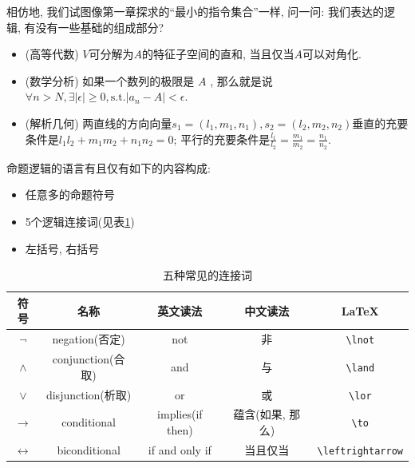相仿地, 我们试图像第一章探求的``最小的指令集合''一样, 问一问: 我们表达的逻辑, 有没有一些基础的组成部分? 

\begin{example}
	\begin{itemize}
		\item (高等代数) $V$可分解为$A$的特征子空间的直和, 当且仅当$A$可以对角化. 
		\item (数学分析) 如果一个数列的极限是 $A$ , 那么就是说$\forall n>N, \exists |\epsilon|\geq 0, \text{s.t.} |a_n-A|<\epsilon$.
		\item (解析几何) 两直线的方向向量$s_{1}=(l_{1},m_{1},n_{1}),s_{2}=(l_{2},m_{2},n_{2})$垂直的充要条件是$l_{1}l_{2}+m_{1}m_{2}+n_{1}n_{2}=0$;
平行的充要条件是$\frac{l_{1}}{l_{2}}=\frac{m_{1}}{m_{2}}=\frac{n_{1}}{n_{2}}.$
	\end{itemize}
\end{example}



\begin{definition}[命题逻辑的语法]
        命题逻辑的语言有且仅有如下的内容构成: 
        \begin{itemize}
            \item 任意多的命题符号
            \item 5个逻辑连接词(见表\ref{fig:conn})
            \item 左括号, 右括号
      	\end{itemize}
\end{definition}

\begin{table}
    \centering
    \begin{tabular}{|c||c|c|c|c|}
      \hline
      符号& 名称 & 英文读法 & 中文读法 & \LaTeX \\
      \hline \hline
      $\lnot$ & {negation}{(否定)} & not & 非 & \verb|\lnot| \\
      \hline
      $\land$ & {conjunction}{(合取)} & and & 与 & \verb|\land| \\
      \hline
      $\lor$ & {disjunction}{(析取)} & or & 或 & \verb|\lor| \\
      \hline
      $\to$ & conditional & {implies}{(if then)}
        & {蕴含}{(如果, 那么)} & \verb|\to| \\
      \hline
      $\leftrightarrow$ & biconditional & if and only if
        & 当且仅当 & \verb|\leftrightarrow| \\
      \hline
      \end{tabular}
      \caption{五种常见的连接词}
    \label{fig:conn}
  \end{table}

